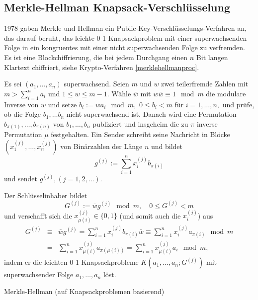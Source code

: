 \begin{refsegment}
\subsection{Merkle-Hellman Knapsack-Verschlüsselung}
 

1978 gaben Merkle und Hellman \cite{Merkle1978}  ein Public-Key-Verschlüsselungs-Verfahren an, das darauf beruht, das leichte 0-1-Knapsackproblem mit einer superwachsenden Folge in ein kongruentes mit einer nicht superwachsenden Folge zu \glqq verfremden\grqq. Es ist eine Blockchiffrierung, die bei jedem Durchgang einen $n$ Bit langen Klartext chiffriert, siehe Krypto-Verfahren \ref{merklehellmanproc}.

\begin{cryptoprocedure}
Es sei $ (a_1, \dots, a_n) $ superwachsend. Seien $ m $ und $ w $ zwei
teilerfremde Zahlen mit $ m >
\sum_{i=1}^{n} a_i $ und $ 1\leq w \leq m-1. $
Wähle $\bar{w} $ mit $ w \bar{w} \equiv 1 \mod m $ die modulare Inverse
von $ w $ und setze $ b_i:= wa_i \mod m, $ $ 0\leq b_i < m $ für $ i=1,
\dots ,n, $ und prüfe, ob die Folge $ b_1, \dots b_n $ nicht superwachsend
ist. Danach wird eine Permutation $ b_{\pi (1)}, \dots , b_{\pi(n)} $
von $ b_1, \dots , b_n $ publiziert und insgeheim die zu $ \pi $ inverse
Permutation $ \mu $ festgehalten. Ein Sender schreibt seine Nachricht
in Blöcke $ (x_1^{(j)}, \dots, x_n^{(j)}) $ von Binärzahlen der Länge
$ n $ und bildet \[ g^{(j)}:= \sum_{i=1}^n x_{i}^{(j)} b_{\pi(i)} \]
und sendet $ g^{(j)}, (j=1,2, \dots). $\par
Der Schlüsselinhaber bildet
\[ G^{(j)}:=\bar{w} g^{(j)} \mod m ,\quad 0 \leq G^{(j)} < m \]
und verschafft sich die $ x_{\mu(i)}^{(j)} \in \{ 0,1\} $ (und somit auch die $ x_i^{(j)} $) aus
\begin{eqnarray*}
G^{(j)} & \equiv & \bar{w} g^{(j)} = \sum_{i=1}^n x_i^{(j)} b_{\pi (i)} \bar{w} \equiv \sum_{i=1}^n x_i^{(j)} a_{\pi (i)} \mod m\\
& = & \sum_{i=1}^n x_{\mu (i)}^{(j)} a_{\pi (\mu (i))} = \sum _{i=1}^n x_{\mu (i)}^{(j)} a_i \mod m,
\end{eqnarray*}
indem er die leichten 0-1-Knapsackprobleme $ K(a_1,\dots,a_n;G^{(j)}) $ mit superwachsender Folge $ a_1, \dots,a_n $ löst.
\caption{Merkle-Hellman (auf Knapsackproblemen basierend)}
\label{merklehellmanproc}
\end{cryptoprocedure}




\end{refsegment}
